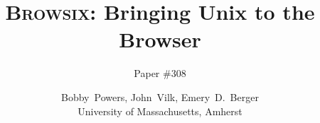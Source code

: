 \documentclass[10pt,twocolumn]{article}
\newcommand{\Browsix}{\textsc{Browsix}\xspace}
\begin{document}
\title{\bf \Browsix{}: Bringing Unix to the Browser}
\author{Paper \#308}

\author{
 Bobby~Powers, John~Vilk, Emery~D.~Berger \\ University of Massachusetts, Amherst
}

\date{}
\maketitle


\begin{abstract}

\end{abstract}























\end{document}
